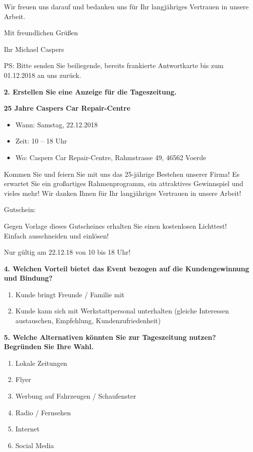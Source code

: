 Wir freuen uns darauf und bedanken uns für Ihr langjähriges Vertrauen in
unsere Arbeit.

Mit freundlichen Grüßen

Ihr Michael Caspers

PS: Bitte senden Sie beiliegende, bereits frankierte Antwortkarte bis
zum 01.12.2018 an uns zurück.

\newpage

\textbf{2. Erstellen Sie eine Anzeige für die Tageszeitung.}

\textbf{25 Jahre Caspers Car Repair-Centre}

\begin{itemize}
\item
  Wann: Samstag, 22.12.2018
\item
  Zeit: 10 -- 18 Uhr
\item
  Wo: Caspers Car Repair-Centre, Rahmstrasse 49, 46562 Voerde
\end{itemize}

Kommen Sie und feiern Sie mit uns das 25-jährige Bestehen unserer Firma!
Es erwartet Sie ein großartiges Rahmenprogramm, ein attraktives
Gewinnspiel und vieles mehr! Wir danken Ihnen für Ihr langjähriges
Vertrauen in unsere Arbeit!

Gutschein:

Gegen Vorlage dieses Gutscheines erhalten Sie einen kostenlosen
Lichttest! Einfach ausschneiden und einlösen!

Nur gültig am 22.12.18 von 10 bis 18 Uhr!

\textbf{4. Welchen Vorteil bietet das Event bezogen auf die
Kundengewinnung und Bindung?}

\begin{enumerate}
\item
  Kunde bringt Freunde / Familie mit
\item
  Kunde kann sich mit Werkstattpersonal unterhalten (gleiche Interessen
  austauschen, Empfehlung, Kundenzufriedenheit)
\end{enumerate}

\textbf{5. Welche Alternativen könnten Sie zur Tageszeitung nutzen?
Begründen Sie Ihre Wahl.}

\begin{enumerate}
\item
  Lokale Zeitungen
\item
  Flyer
\item
  Werbung auf Fahrzeugen / Schaufenster
\item
  Radio / Fernsehen
\item
  Internet
\item
  Social Media
\end{enumerate}

